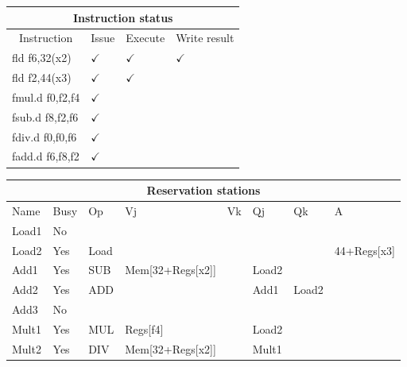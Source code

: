     \begin{figure}[h]
        \centering
        \begin{tabular}{|l|l|l|l|l|l|l|l|}
            \hline
            \multicolumn{8}{|c|}{Instruction status} \\
            \hline
            \multicolumn{2}{|c|}{Instruction} & \multicolumn{2}{c|}{Issue} & \multicolumn{2}{c|}{Execute} & \multicolumn{2}{c|}{Write result} \\
            \hline
            \multicolumn{2}{|l|}{fld f6,32(x2)} & \multicolumn{2}{l|}{$\checkmark$} & \multicolumn{2}{l|}{$\checkmark$} & \multicolumn{2}{l|}{$\checkmark$} \\
            \hline
            \multicolumn{2}{|l|}{fld f2,44(x3)} & \multicolumn{2}{l|}{$\checkmark$} & \multicolumn{2}{l|}{$\checkmark$} & \multicolumn{2}{l|}{} \\
            \hline
            \multicolumn{2}{|l|}{fmul.d f0,f2,f4} & \multicolumn{2}{l|}{$\checkmark$} & \multicolumn{2}{l|}{} & \multicolumn{2}{l|}{} \\
            \hline
            \multicolumn{2}{|l|}{fsub.d f8,f2,f6} & \multicolumn{2}{l|}{$\checkmark$} & \multicolumn{2}{l|}{} & \multicolumn{2}{l|}{} \\
            \hline
            \multicolumn{2}{|l|}{fdiv.d f0,f0,f6} & \multicolumn{2}{l|}{$\checkmark$} & \multicolumn{2}{l|}{} & \multicolumn{2}{l|}{} \\
            \hline
            \multicolumn{2}{|l|}{fadd.d f6,f8,f2} & \multicolumn{2}{l|}{$\checkmark$} & \multicolumn{2}{l|}{} & \multicolumn{2}{l|}{} \\
            \hline
        \end{tabular}
        
        \vspace{0.5cm}
        
        \begin{tabular}{|l|l|l|l|l|l|l|l|}
            \hline
            \multicolumn{8}{|c|}{Reservation stations} \\
            \hline
            Name & Busy & Op & Vj & Vk & Qj & Qk & A \\
            \hline
            Load1 & No & & & & & & \\
            \hline
            Load2 & Yes & Load & & & & & 44+Regs[x3] \\
            \hline
            Add1 & Yes & SUB & Mem[32+Regs[x2]] & & Load2 & & \\
            \hline
            Add2 & Yes & ADD & & & Add1 & Load2 & \\
            \hline
            Add3 & No & & & & & & \\
            \hline
            Mult1 & Yes & MUL & Regs[f4] & & Load2 & & \\
            \hline
            Mult2 & Yes & DIV & Mem[32+Regs[x2]] & & Mult1 & & \\
            \hline
        \end{tabular}
        

\end{figure}
